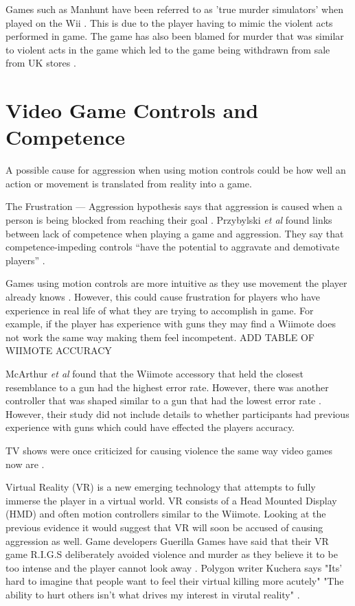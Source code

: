 \documentclass{scrartcl}
\begin{document}
Games such as Manhunt have been referred to as 'true murder simulators' when played on the Wii \cite{Manhunt}. This is due to the player having to mimic the violent acts performed in game.
The game has also been blamed for murder that was similar to violent acts in the game which led to the game being withdrawn from sale from UK stores \cite{Manhunt2Ban, ManhuntMurder}.


\section{Video Game Controls and Competence}
A possible cause for aggression when using motion controls could be how well an action or movement is translated from reality into a game.  

The Frustration --- Aggression hypothesis says that aggression is caused when a person is being blocked from reaching their goal \cite{dollard1939frustration}.  Przybylski \textit{et al} found links between lack of competence when playing a game and aggression. They say that competence-impeding controls ``have the potential to aggravate and demotivate players” \cite{przybylski}.

Games using motion controls are more intuitive as they use movement the player already knows \cite{Kim}. However, this could cause frustration for players who have experience in real life of what they are trying to accomplish in game. For example, if the player has experience with guns they may find a Wiimote does not work the same way making them feel incompetent. 
\bigskip
ADD TABLE OF WIIMOTE ACCURACY
\bigskip


McArthur \textit{et al}  found that the Wiimote accessory that held the closest resemblance to a gun had the highest error rate. However, there was another controller that was shaped similar to a gun that had the lowest error rate \cite{McArthur}.  However, their study did not include details to whether participants had previous experience with guns which could have effected the players accuracy. 

 
\bigskip

TV shows were once criticized for causing violence the same way video games now are \cite{sherry2001effects}.

Virtual Reality (VR) is a new emerging technology that attempts to fully immerse the player in a virtual world. VR consists of a Head Mounted Display (HMD) and often motion controllers similar to the Wiimote.
Looking at the previous evidence it would suggest that VR will soon be accused of causing aggression as well. Game developers Guerilla Games have said that their VR game R.I.G.S deliberately avoided violence and murder as they believe it to be too intense and the player cannot look away \cite{VRViolence}.
Polygon writer Kuchera says "Its' hard to imagine that people want to feel their virtual killing more acutely"     "The ability to hurt others isn't what drives my interest in virutal reality" \cite{PolygonVR} .
\end{document}

